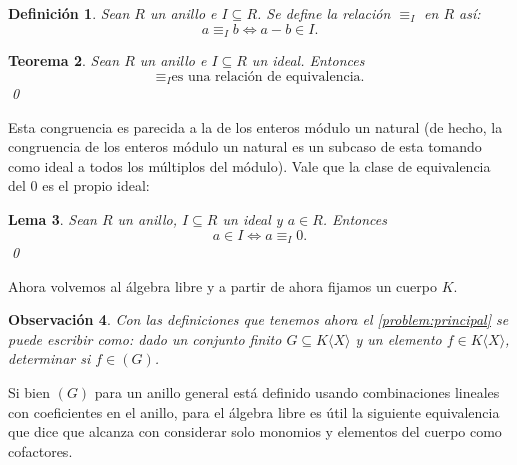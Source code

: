 \documentclass[12pt]{report}
\theoremstyle{customstyle}
\newtheorem{theorem}{Teorema}[chapter]
\newtheorem{definition}[theorem]{Definición}
\newtheorem{lemma}[theorem]{Lema}
\newtheorem{observation}[theorem]{Observación}
\theoremstyle{factstyle}
\begin{document}
\begin{definition}\label{def:congruencia mod ideal}
  Sean $R$ un anillo e $I ⊆ R$. Se define la relación $≡_I$ en $R$ así:
  \[ a ≡_I b ⇔ a - b ∈ I \text{.}\]
\end{definition}

\begin{theorem}\label{thm:congruencia mod ideal es equivalencia}
  Sean $R$ un anillo e $I ⊆ R$ un ideal. Entonces
  \[ ≡_I \text{es una relación de equivalencia} \text{.}\]
  \qed
\end{theorem}

Esta congruencia es parecida a la de los enteros módulo un natural (de hecho, la congruencia de los enteros módulo un natural es un subcaso de esta tomando como ideal a todos los múltiplos del módulo). Vale que la clase de equivalencia del $0$ es el propio ideal:

\begin{lemma}\label{lemma:en ideal ⇔ congruente 0}
  Sean $R$ un anillo, $I ⊆ R$ un ideal y $a ∈ R$. Entonces
  \[ a ∈ I ⇔ a ≡_I 0 \text{.}\]
  \qed
\end{lemma}


Ahora volvemos al álgebra libre y a partir de ahora fijamos un cuerpo $K$.

\begin{observation}
  Con las definiciones que tenemos ahora el \cref{problem:principal} se puede escribir como: dado un conjunto finito $G ⊆ K⟨X⟩$ y un elemento $f ∈ K⟨X⟩$, determinar si $f ∈ (G)$.
\end{observation}

Si bien $(G)$ para un anillo general está definido usando combinaciones lineales con coeficientes en el anillo, para el álgebra libre es útil la siguiente equivalencia que dice que alcanza con considerar solo monomios y elementos del cuerpo como cofactores.
\end{document}
